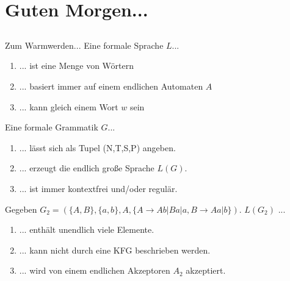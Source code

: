 
\section[Einstieg]{Guten Morgen...}
\subsection*{}
\begin{frame}{Zum Warmwerden...}
  Eine formale Sprache $L$...
    \begin{enumerate}
    \item { 
    ... ist eine Menge von Wörtern
    }
    \item { 
    ... basiert immer auf einem endlichen Automaten $A$
    }
    \item { 
    ... kann gleich einem Wort $w$ sein
    }
    \end{enumerate}
	
  Eine formale Grammatik $G$...
    \begin{enumerate}
    \item { 
    ... lässt sich als Tupel (N,T,S,P) angeben.
    }
    \item { 
    ... erzeugt die endlich große Sprache $L(G)$.
    }
    \item { 
    ... ist immer kontextfrei und/oder regulär.
    }
    \end{enumerate}

	 Gegeben $G_2=(\{A,B\}, \{a,b\}, A, \{A \to Ab|Ba|a, B \to Aa|b \})$. $L(G_2)$ ...
	   \begin{enumerate}
	   \item { \only<4->{ \color{green!50!black} }
	   ... enthält unendlich viele Elemente.
	   }
	   \item { \only<4->{ \color{red} }
	   ... kann nicht durch eine KFG beschrieben werden.
	   }
	   \item { \only<4->{ \color{green!50!black} }
	   ... wird von einem endlichen Akzeptoren $A_2$ akzeptiert.
	   }
	   \end{enumerate}
\end{frame}
